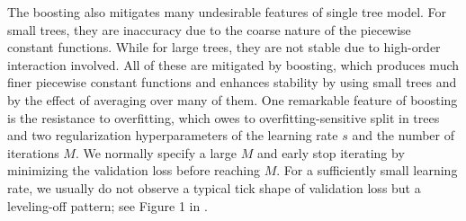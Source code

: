 \documentclass[11pt]{article}
\numberwithin{equation}{section}
\begin{document}
The boosting also mitigates many undesirable features of single tree model. 
For small trees, they are inaccuracy due to the coarse nature of the piecewise constant functions. While for large trees, they are not stable due to high-order interaction involved.
All of these are mitigated by boosting, which produces much finer piecewise constant functions and enhances stability by using small trees and by the effect of averaging over many of them.
One remarkable feature of boosting is the resistance to overfitting, which owes to  overfitting-sensitive split in trees and two regularization hyperparameters of the learning rate $s$ and the number of iterations $M$.
We normally specify a large $M$ and early stop iterating by minimizing the validation loss before reaching $M$.
For a sufficiently small learning rate, we usually do not observe a typical tick shape of validation loss but a leveling-off pattern; see Figure 1 in \cite{friedman2001greedy}.
\end{document}
